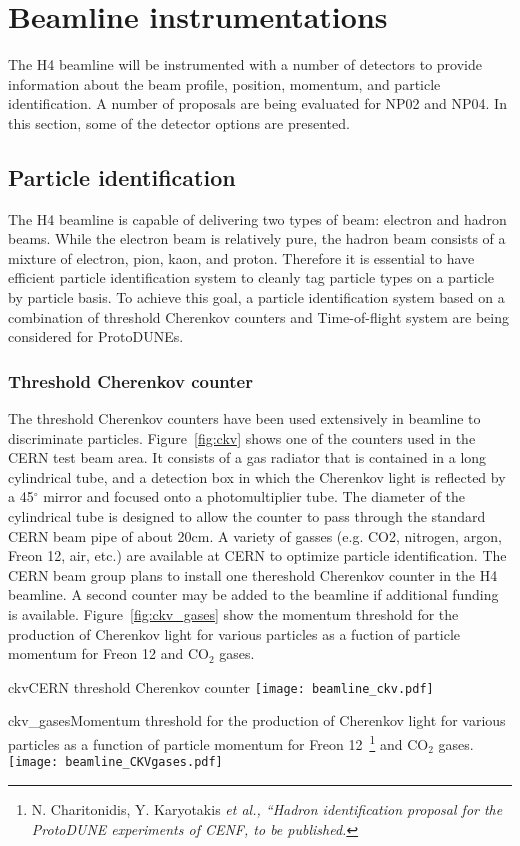 \section{Beamline instrumentations}
\label{sec:beaminstruments}

The H4 beamline will be instrumented with a number of detectors to provide information about the beam profile, position, momentum, and particle identification. A number of proposals are being evaluated for NP02 and NP04. In this section, some of the detector options are presented.

\subsection{Particle identification}
The H4 beamline is capable of delivering two types of beam: electron and hadron beams. While the electron beam is relatively pure, the hadron beam consists of a mixture of electron, pion, kaon, and proton. Therefore it is essential to have efficient particle identification system to cleanly tag particle types on a particle by particle basis. To achieve this goal, a particle identification system based on a combination of threshold Cherenkov counters and Time-of-flight system are being considered for ProtoDUNEs.

\subsubsection{Threshold Cherenkov counter}
The threshold Cherenkov counters have been used extensively in beamline to discriminate particles. Figure~\ref{fig:ckv} shows one of the counters used in the CERN test beam area. It consists of a gas radiator that is contained in a long cylindrical tube, and a detection box in which the Cherenkov light is reflected by a 45$^\circ$ mirror and focused onto a photomultiplier tube. The diameter of the cylindrical tube is designed to allow the counter to pass through the standard CERN beam pipe of about 20cm. A variety of gasses (e.g. CO2, nitrogen, argon, Freon 12, air, etc.) are available at CERN to optimize particle identification. The CERN beam group plans to install one thereshold Cherenkov counter in the H4 beamline. A second counter may be added to the beamline if additional funding is available. Figure~\ref{fig:ckv_gases} show the momentum threshold for the production of Cherenkov light for various particles as a fuction of particle momentum for Freon 12 and CO$_2$ gases.
\begin{cdrfigure}{ckv}{CERN threshold Cherenkov counter}
  \texttt{[image: beamline\_ckv.pdf]}
\end{cdrfigure}
\begin{cdrfigure}{ckv_gases}{Momentum threshold for the production of Cherenkov light for various particles as a function of particle momentum for Freon 12~\footnote{N. Charitonidis, Y. Karyotakis \it{et al.}, ``Hadron identification proposal for the ProtoDUNE experiments of CENF, to be published.} and CO$_2$ gases.}
  \texttt{[image: beamline\_CKVgases.pdf]}
\end{cdrfigure}


